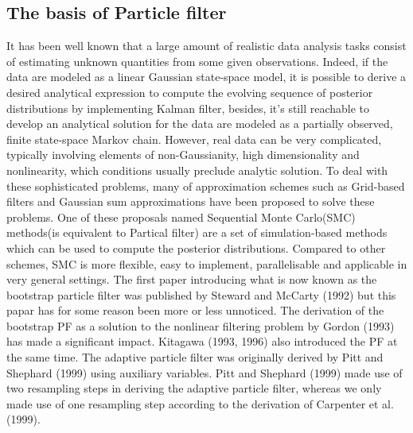 \documentclass[11pt,oneside,a4paper]{article}
\begin{document}
\subsection{The basis of Particle filter}
It has been well known that a large amount of realistic data analysis tasks consist of estimating unknown quantities
from some given observations. Indeed, if the data are modeled as a linear Gaussian state-space model, it is possible
to derive a desired analytical expression to compute the evolving sequence of posterior distributions by implementing
Kalman filter, besides, it's still reachable to develop an analytical solution for the data are modeled as a partially
observed, finite state-space Markov chain. However, real data can be very complicated, typically involving elements of
non-Gaussianity, high dimensionality and nonlinearity, which conditions usually preclude analytic solution.
To deal with these sophisticated problems, many of approximation schemes such as Grid-based filters and Gaussian sum
approximations have been proposed to solve these problems.  One of these proposals named Sequential Monte Carlo(SMC)
methods(is equivalent to Partical filter) are a set of simulation-based methods which can be used to compute the posterior distributions.
Compared to other schemes, SMC is more flexible, easy to implement, parallelisable and applicable in very general
settings. The first paper introducing what is now known as the bootstrap particle filter was published by Steward and McCarty (1992)
but this papar has for some reason been more or less unnoticed. The derivation of the bootstrap PF as a solution to the nonlinear
filtering problem by Gordon (1993) has made a significant impact. Kitagawa (1993, 1996) also introduced the PF at the same time.
The adaptive particle filter was originally derived by Pitt and Shephard (1999) using auxiliary variables. Pitt and Shephard (1999) made
use of two resampling steps in deriving the adaptive particle filter, whereas we only made use of one resampling step according to the
derivation of Carpenter et al.(1999).
\end{document}
